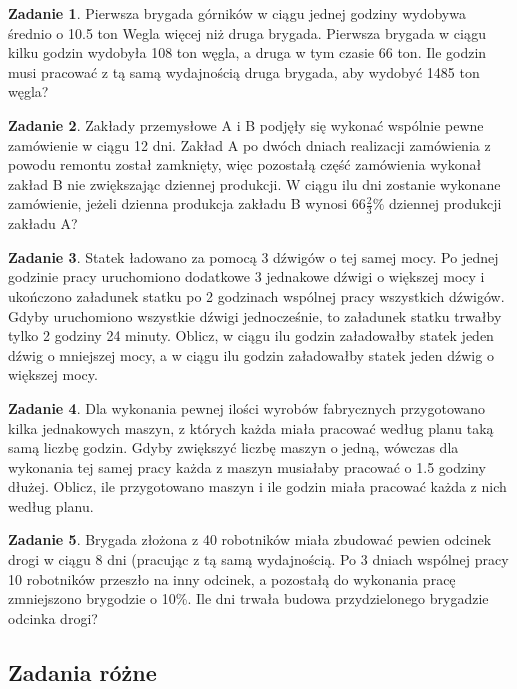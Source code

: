 \documentclass[11pt]{article}
\theoremstyle{definition}
\newtheorem{zad}{Zadanie}
\numberwithin{zad}{section}
\begin{document}
\begin{zad}
Pierwsza brygada górników w ciągu jednej godziny wydobywa średnio o 10.5 ton Wegla więcej niż druga brygada. Pierwsza brygada w ciągu kilku godzin wydobyła 108 ton węgla, a druga w tym czasie 66 ton. Ile godzin musi pracować z tą samą wydajnością druga brygada, aby wydobyć 1485 ton węgla?
\end{zad}

\begin{zad}
Zakłady przemysłowe A i B podjęły się wykonać wspólnie pewne zamówienie w ciągu 12 dni. Zakład A po dwóch dniach realizacji zamówienia z powodu remontu został zamknięty, więc pozostałą część zamówienia wykonał zakład B nie zwiększając dziennej produkcji. W ciągu ilu dni zostanie wykonane zamówienie, jeżeli dzienna produkcja zakładu B wynosi $66\frac23\%$ dziennej produkcji zakładu A?
\end{zad}

\begin{zad}
Statek ładowano za pomocą 3 dźwigów o tej samej mocy. Po jednej godzinie pracy uruchomiono dodatkowe 3 jednakowe dźwigi o większej mocy i ukończono załadunek statku po 2 godzinach wspólnej pracy wszystkich dźwigów. Gdyby uruchomiono wszystkie dźwigi jednocześnie, to załadunek statku trwałby tylko 2 godziny 24 minuty. Oblicz, w ciągu ilu godzin załadowałby statek jeden dźwig o mniejszej mocy, a w ciągu ilu godzin załadowałby statek jeden dźwig o większej mocy.
\end{zad}

\begin{zad}
Dla wykonania pewnej ilości wyrobów fabrycznych przygotowano kilka jednakowych maszyn, z których każda miała pracować według planu taką samą liczbę godzin. Gdyby zwiększyć liczbę maszyn o jedną, wówczas dla wykonania tej samej pracy każda z maszyn musiałaby pracować o 1.5 godziny dłużej. Oblicz, ile przygotowano maszyn i ile godzin miała pracować każda z nich według planu.
\end{zad}

\begin{zad}
Brygada złożona z 40 robotników miała zbudować pewien odcinek drogi w ciągu 8 dni (pracując z tą samą wydajnością. Po 3 dniach wspólnej pracy 10 robotników przeszło na inny odcinek, a pozostałą do wykonania pracę zmniejszono brygodzie o 10\%. Ile dni trwała budowa przydzielonego brygadzie odcinka drogi?
\end{zad}

\subsection{Zadania różne}
\end{document}
